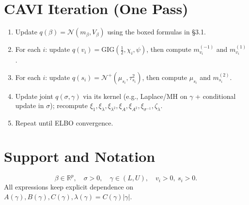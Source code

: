 \documentclass[11pt]{article}
\newcommand{\Normal}{\mathcal{N}}
\newcommand{\TN}{\mathcal{N}^{+}}
\newcommand{\GIG}{\mathrm{GIG}}
\begin{document}
\section{CAVI Iteration (One Pass)}
\begin{enumerate}
\item Update \(q(\beta)=\Normal(m_\beta,V_\beta)\) using the boxed formulas in \S3.1.
\item For each \(i\): update \(q(v_i)=\GIG(\tfrac12,\chi_i,\psi)\), then compute \(m_{v_i}^{(-1)}\) and \(m_{v_i}^{(1)}\).
\item For each \(i\): update \(q(s_i)=\TN(\mu_{s_i},\tau_{s_i}^2)\), then compute \(\mu_{s_i}\) and \(m_{s_i}^{(2)}\).
\item Update joint \(q(\sigma,\gamma)\) via its kernel (e.g., Laplace/MH on \(\gamma\) + conditional update in \(\sigma\)); recompute \(\xi_1,\xi_\lambda,\xi_{\lambda^2},\xi_A,\xi_{A^2},\xi_{\sigma^{-1}},\zeta_\lambda\).
\item Repeat until ELBO convergence.
\end{enumerate}

\section{Support and Notation}
\[
\beta\in\mathbb{R}^p,\quad \sigma>0,\quad \gamma\in(L,U),\quad v_i>0,\ s_i>0.
\]
All expressions keep explicit dependence on \(A(\gamma),B(\gamma),C(\gamma),\lambda(\gamma)=C(\gamma)|\gamma|\).
\end{document}
